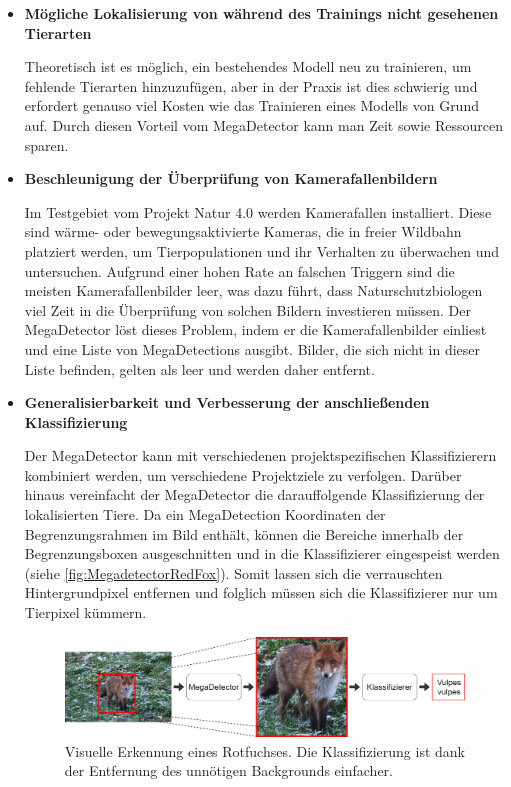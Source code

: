 \begin{itemize}
	\item \textbf{Mögliche Lokalisierung von während des Trainings nicht gesehenen Tierarten}
	
	Theoretisch ist es möglich, ein bestehendes Modell neu zu trainieren, um fehlende Tierarten hinzuzufügen, aber in der Praxis ist dies schwierig und erfordert genauso viel Kosten wie das Trainieren eines Modells von Grund auf. Durch diesen Vorteil vom MegaDetector kann man Zeit sowie Ressourcen sparen.
	
	\item \textbf{Beschleunigung der Überprüfung von Kamerafallenbildern}
	
	Im Testgebiet vom Projekt Natur 4.0 werden Kamerafallen installiert. Diese sind wärme- oder bewegungsaktivierte Kameras, die in freier Wildbahn platziert werden, um Tierpopulationen und ihr Verhalten zu überwachen und untersuchen. Aufgrund einer hohen Rate an falschen Triggern sind die meisten Kamerafallenbilder leer, was dazu führt, dass Naturschutzbiologen viel Zeit in die Überprüfung von solchen Bildern investieren müssen.	Der MegaDetector löst dieses Problem, indem er die Kamerafallenbilder einliest und eine Liste von MegaDetections ausgibt. Bilder, die sich nicht in dieser Liste befinden, gelten als leer und werden daher entfernt.
	
	\item \textbf{Generalisierbarkeit und Verbesserung der anschließenden Klassifizierung}
	
	Der MegaDetector kann mit verschiedenen projektspezifischen Klassifizierern kombiniert werden, um verschiedene Projektziele zu verfolgen. Darüber hinaus vereinfacht der MegaDetector die darauffolgende Klassifizierung der lokalisierten Tiere. Da ein MegaDetection Koordinaten der Begrenzungsrahmen im Bild enthält, können die Bereiche innerhalb der Begrenzungsboxen ausgeschnitten und in die Klassifizierer eingespeist werden (siehe \autoref{fig:MegadetectorRedFox}). Somit lassen sich die verrauschten Hintergrundpixel entfernen und folglich müssen sich die Klassifizierer nur um Tierpixel kümmern.
	
	\begin{figure}[!hb]
		\centering
		\includegraphics[width=\linewidth]{images/MegadetectorRedFox}
		\caption{Visuelle Erkennung eines Rotfuchses. Die Klassifizierung ist dank der Entfernung des unnötigen Backgrounds einfacher.}
		\label{fig:MegadetectorRedFox}
	\end{figure}
	
\end{itemize}

